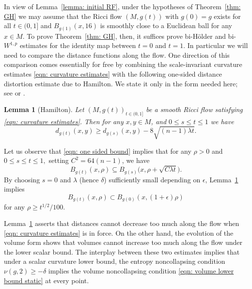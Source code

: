 \documentclass[11pt,reqno]{amsart}
\newtheorem{lemma}[theorem]{Lemma}
\theoremstyle{remark}
\theoremstyle{definition}
\numberwithin{equation}{section}
\newcommand{\e}{{\epsilon}}
\newcommand{\ETA}{{{\lambda}}}
\begin{document}
%
%
%
%
%
In view of Lemma~\ref{lemma: initial RF},  under the hypotheses of Theorem~\ref{thm: GH} we may assume that the Ricci flow $(M,g(t))$ with $g(0)=g$ exists for all $t \in (0,1]$ and $B_{g(1)}(x, 16)$ is smoothly close to a Euclidean ball for any $x\in M$.
 To prove Theorem~\ref{thm: GH}, then, it suffices prove bi-H\"{o}lder and bi-$W^{1,p}$ estimates for the identity map between $t=0$ and $t=1$. In particular we will need to compare the distance functions along the flow. One direction of this comparison comes essentially for free by  combining the scale-invariant curvature estimates \eqref{eqn: curvature estimates} with 
 the following  one-sided distance distortion estimate due to Hamilton. We state it only in the form needed here; see \cite[Theorem 17.1]{HamiltonRFsurvey} or \cite[Lemma 8.33]{CLNbook}.

\begin{lemma}[Hamilton]\label{prop: half distortion}
Let $(M,g(t))_{t \in (0,1]}$ be a smooth Ricci flow satisfying \eqref{eqn: curvature estimates}. 
  Then for any $x,y\in M$, and $0\leq s \leq t\leq1$ we have 
	 \begin{equation}\label{eqn: one sided bound}
	 d_{g(t)}(x,y) \geq d_{g(s)}(x,y) -8\sqrt{(n-1)\ETA t}.
	 \end{equation}
\end{lemma} 
Let us observe that \eqref{eqn: one sided bound} implies that for any $\rho>0$ and $0\leq s\leq t \leq 1,$  setting $C^2 =64(n-1)$, we have
\begin{equation}\label{eqn: containment of balls}
	B_{g(t)}\left(x, \rho\right) \subseteq B_{g(s)}\big(x, \rho+ \sqrt{C\ETA t}\big).
\end{equation}
By choosing $s=0$ and $\ETA$ (hence $\delta$) sufficiently small depending on $\e$, Lemma~\ref{prop: half distortion} implies 
\begin{equation}
	\label{eqn: one containmentA}
B_{g(t)}(x, \rho) \subset B_{g(0)}(x , (1+\e) \rho)
\end{equation}
for any $\rho \geq t^{1/2}/100.$


Lemma~\ref{prop: half distortion} asserts that distances cannot decrease too much along the flow when \eqref{eqn: curvature estimates} is in force. On the other hand, the evolution of the volume form shows that volumes cannot increase too much along the flow under the lower scalar bound. The interplay between these two estimates implies that under a scalar curvature lower bound, the entropy noncollapsing condition $\nu(g,2)\geq -\delta$ implies the volume noncollapsing condition \eqref{eqn: volume lower bound static} at every point.
\end{document}
